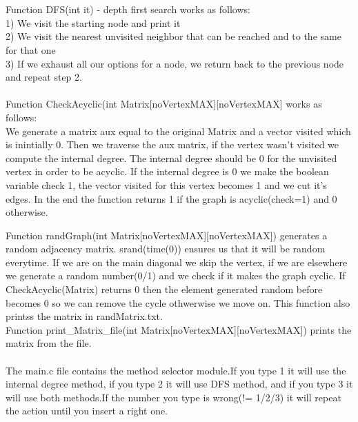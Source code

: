 \documentclass[14pt]{article}
\begin{document}
\\\vspace{2 mm}
\\Function DFS(int it) - depth first search works as follows: 
\\1) We visit the starting node and print it
\\2) We visit the nearest unvisited neighbor that can be reached and to the same for that one
\\3) If we exhaust all our options for a node, we return back to the previous node and repeat step 2.
\\\vspace{3 mm}
\\Function CheckAcyclic(int Matrix[noVertexMAX][noVertexMAX] works as follows:\\We generate a matrix aux equal to the original Matrix and a vector visited which is inintially 0. Then we traverse the aux matrix, if the vertex wasn't visited we compute the internal degree. The internal degree should be 0 for the unvisited vertex in order to be acyclic. If the internal degree is 0 we make the boolean variable check 1, the vector visited for this vertex becomes 1 and we cut it's edges. In the end the function returns 1 if the graph is acyclic(check=1) and 0 otherwise.
\\\vspace{2 mm}

Function randGraph(int Matrix[noVertexMAX][noVertexMAX]) generates a random adjacency matrix. srand(time(0)) ensures us that it will be random everytime. If we are on the main diagonal we skip the vertex, if we are elsewhere we generate a random number(0/1) and we check if it makes the graph cyclic. If CheckAcyclic(Matrix) returns 0 then the element generated random before becomes 0 so we can remove the cycle othwerwise we move on. This function also printss the matrix in randMatrix.txt.
\\\vspace{2mm}
Function print\_Matrix\_file(int Matrix[noVertexMAX][noVertexMAX]) prints the matrix from the file.
\\\vspace{3 mm}
\\The main.c file contains the method selector module.If you type 1 it will use the internal degree method, if you type 2 it will use DFS method, and if you type 3 it will use both methods.If the number you type is wrong(!= 1/2/3) it will repeat the action until you insert a right one.

\newpage
\end{document}

